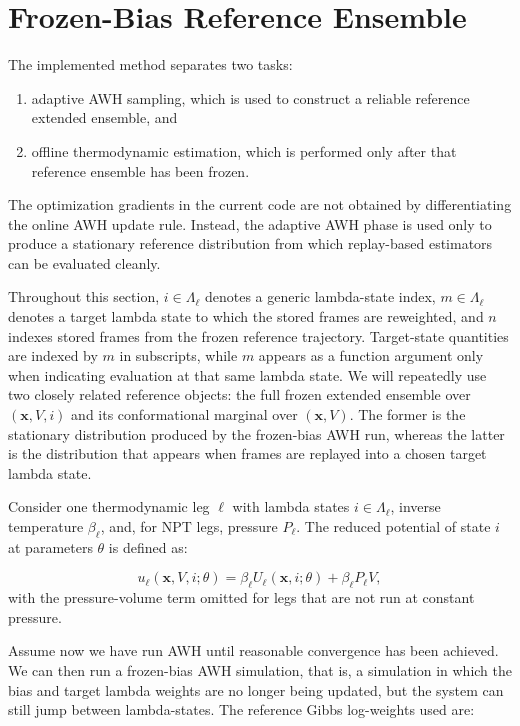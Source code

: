 \section{Frozen-Bias Reference Ensemble}

The implemented method separates two tasks:

\begin{enumerate}
    \item adaptive AWH sampling, which is used to construct a reliable reference extended ensemble, and
    \item offline thermodynamic estimation, which is performed only after that reference ensemble has been frozen.
\end{enumerate}
%
The optimization gradients in the current code are not obtained by differentiating the online AWH update rule. Instead, the adaptive AWH phase is used only to produce a stationary reference distribution from which replay-based estimators can be evaluated cleanly.

Throughout this section, $i \in \Lambda_\ell$ denotes a generic lambda-state index, $m \in \Lambda_\ell$ denotes a target lambda state to which the stored frames are reweighted, and $n$ indexes stored frames from the frozen reference trajectory. Target-state quantities are indexed by $m$ in subscripts, while $m$ appears as a function argument only when indicating evaluation at that same lambda state. We will repeatedly use two closely related reference objects: the full frozen extended ensemble over $(\mathbf{x}, V, i)$ and its conformational marginal over $(\mathbf{x}, V)$. The former is the stationary distribution produced by the frozen-bias AWH run, whereas the latter is the distribution that appears when frames are replayed into a chosen target lambda state.

Consider one thermodynamic leg $\ell$ with lambda states $i \in \Lambda_\ell$, inverse temperature $\beta_\ell$, and, for NPT legs, pressure $P_\ell$. The reduced potential of state $i$ at parameters $\theta$ is defined as:

\begin{equation}
    u_\ell(\mathbf{x}, V, i; \theta)
    =
    \beta_\ell U_\ell(\mathbf{x}, i; \theta)
    +
    \beta_\ell P_\ell V,
    \label{eq:reducedpotential}
\end{equation}
%
with the pressure-volume term omitted for legs that are not run at constant pressure.

Assume now we have run AWH until reasonable convergence has been achieved. We can then run a frozen-bias AWH simulation, that is, a simulation in which the bias and target lambda weights are no longer being updated, but the system can still jump between lambda-states. The reference Gibbs log-weights used are:

